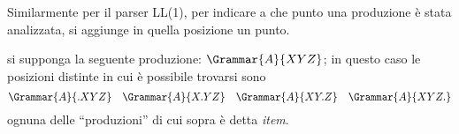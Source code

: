 \documentclass{subfiles}
\begin{document}
\noindent Similarmente per il parser LL(1), per indicare a che punto una produzione è stata analizzata, si aggiunge in quella posizione un punto.

\begin{Example*}
    si supponga la seguente produzione: $\Grammar{A}{XYZ}$;
    in questo caso le posizioni distinte in cui è possibile trovarsi sono
    $$
        \Grammar{A}{.XYZ} \quad \Grammar{A}{X.YZ} \quad \Grammar{A}{XY.Z} \quad \Grammar{A}{XYZ.}
    $$
    ognuna delle ``produzioni'' di cui sopra è detta \emph{item}.
\end{Example*}
\end{document}
